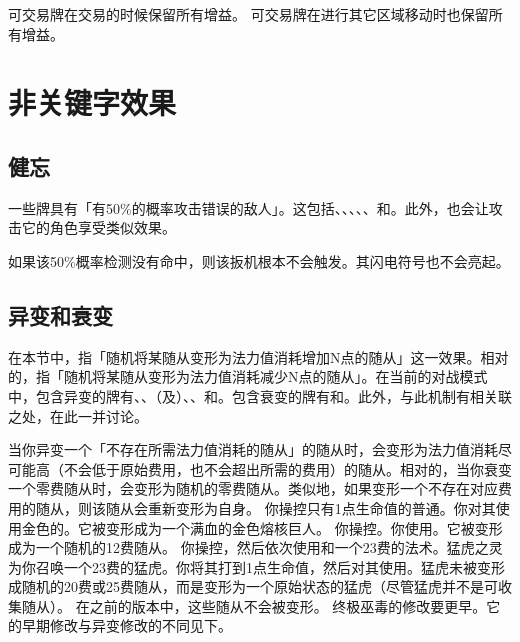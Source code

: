 可交易牌在交易的时候保留所有增益。
\notice {}可交易牌在进行其它区域移动时也保留所有增益。

\section{非关键字效果}

\subsection{健忘}
\label{forgetful}

一些牌具有「有50\%的概率攻击错误的敌人」。这包括、、、、、和。此外，也会让攻击它的角色享受类似效果。

如果该50\%概率检测没有命中，则该扳机根本不会触发。其闪电符号也不会亮起。

\subsection{异变和衰变}
\label{evolve-and-devolve}

在本节中，指「随机将某随从变形为法力值消耗增加N点的随从」这一效果。相对的，指「随机将某随从变形为法力值消耗减少N点的随从」。在当前的对战模式中，包含异变的牌有、、（及）、、和。包含衰变的牌有和。此外，与此机制有相关联之处，在此一并讨论。

 当你异变一个「不存在所需法力值消耗的随从」的随从时，会变形为法力值消耗尽可能高（不会低于原始费用，也不会超出所需的费用）的随从。相对的，当你衰变一个零费随从时，会变形为随机的零费随从。类似地，如果变形一个不存在对应费用的随从，则该随从会重新变形为自身。
\example 你操控只有1点生命值的普通。你对其使用金色的。它被变形成为一个满血的金色熔核巨人。
\example 你操控。你使用。它被变形成为一个随机的12费随从。
\example 你操控，然后依次使用和一个23费的法术。猛虎之灵为你召唤一个23费的猛虎。你将其打到1点生命值，然后对其使用。猛虎未被变形成随机的20费或25费随从，而是变形为一个原始状态的猛虎（尽管猛虎并不是可收集随从）。
\notice 在之前的版本中，这些随从不会被变形。
\notice 终极巫毒的修改要更早。它的早期修改与异变修改的不同见下。

